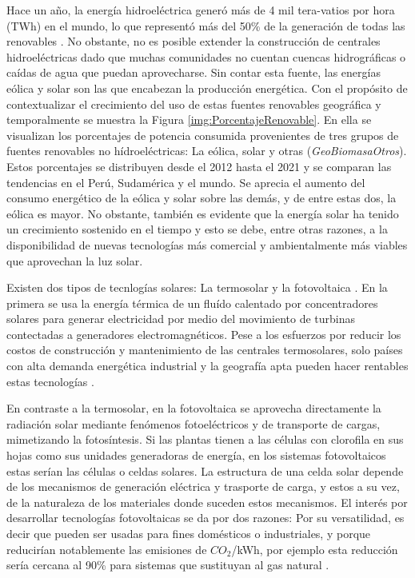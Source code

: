 Hace un año, la energía hidroeléctrica generó más de 4 mil tera-vatios por hora (TWh) en el mundo, lo que representó más del 50\% de la generación de todas las renovables \cite{irena2022international}. No obstante, no es posible extender la construcción de centrales hidroeléctricas dado que muchas comunidades no cuentan cuencas hidrográficas o caídas de agua que puedan aprovecharse. Sin contar esta fuente, las energías eólica y solar son las que encabezan la producción energética. Con el propósito de contextualizar el crecimiento del uso de estas fuentes renovables geográfica y temporalmente se muestra la Figura \ref{img:PorcentajeRenovable}. En ella se visualizan los porcentajes de potencia consumida provenientes de tres grupos de fuentes renovables no hídroeléctricas: La eólica, solar y otras (\textit{GeoBiomasaOtros}). Estos porcentajes se distribuyen desde el 2012 hasta el 2021 y se comparan las tendencias en el Perú, Sudamérica y el mundo. Se aprecia el aumento del consumo energético de la eólica y solar sobre las demás, y de entre estas dos, la eólica es mayor. No obstante, también es evidente que la energía solar ha tenido un crecimiento sostenido en el tiempo y esto se debe, entre otras razones, a la disponibilidad de nuevas tecnologías más comercial y ambientalmente más viables que aprovechan la luz solar.



Existen dos tipos de tecnlogías solares: La termosolar y la fotovoltaica \cite{hammarstrom2012}. En la primera se usa la energía térmica de un fluído calentado por concentradores solares para generar electricidad por medio del movimiento de turbinas contectadas a generadores electromagnéticos. Pese a los esfuerzos por reducir los costos de construcción y mantenimiento de las centrales termosolares, solo países con alta demanda energética industrial y la geografía apta pueden hacer rentables estas tecnologías \cite{xu2022concentrated}.


En contraste a la termosolar, en la fotovoltaica se aprovecha directamente la radiación solar mediante fenómenos fotoeléctricos y de transporte de cargas, mimetizando la fotosíntesis. Si las plantas tienen a las células con clorofila en sus hojas como sus unidades generadoras de energía, en los sistemas fotovoltaicos estas serían las células o celdas solares. La estructura de una celda solar depende de los mecanismos de generación eléctrica y trasporte de carga, y estos a su vez, de la naturaleza de los materiales donde suceden estos mecanismos. El interés por desarrollar tecnologías fotovoltaicas se da por dos razones: Por su versatilidad, es decir que pueden ser usadas para fines domésticos o industriales, y  porque reducirían notablemente las emisiones de $CO_2$/kWh, por ejemplo esta reducción sería cercana al 90\% para sistemas que sustituyan al gas natural \cite{tawalbeh2021environmental}.


